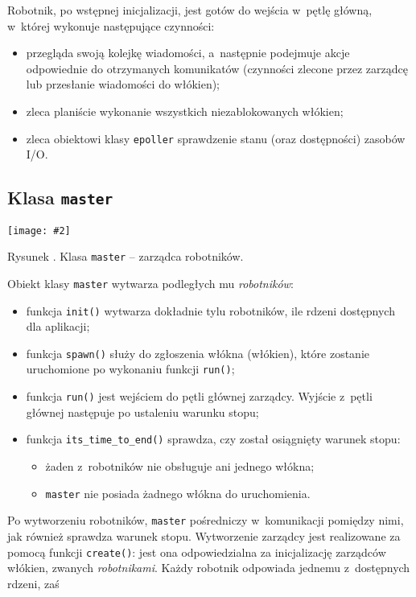 \documentclass[12pt]{mwart}
\newcommand{\code}{\texttt}
\newcounter{figmain}
\newcommand{\myownfigure}[4]{ \newcounter{#1} \setcounter{#1}{\value{figmain}} \addtocounter{figmain}{1} \begin{center} \label{fig:#1} \centering \texttt{[image: \#2]}\\ \nopagebreak[5] \parbox[t]{11.5cm}{Rysunek \arabic{#1}. #3.} \end{center}}
\begin{document}
\par
\indent
  Robotnik, po wstępnej inicjalizacji, jest gotów do wejścia w~pętlę główną, w~której wykonuje następujące czynności:
  \begin{itemize}
    \item przegląda swoją kolejkę wiadomości, a~następnie podejmuje akcje odpowiednie do otrzymanych komunikatów (czynności zlecone przez zarządcę 
      lub przesłanie wiadomości do włókien);
    \item zleca planiście wykonanie wszystkich niezablokowanych włókien;
    \item zleca obiektowi klasy \code{epoller} sprawdzenie stanu (oraz dostępności) zasobów I/O.
  \end{itemize}
\par
%
\newpage
\subsection{Klasa \code{master}}
    \myownfigure{Master}{Master.png}{Klasa \code{master} -- zarządca robotników}{.7}
%
\indent
  Obiekt klasy \code{master} wytwarza podległych mu \emph{robotników}:  
  \begin{itemize}
    \item funkcja \code{init()} wytwarza dokładnie tylu robotników, ile rdzeni dostępnych dla aplikacji;
    \item funkcja \code{spawn()} służy do zgłoszenia włókna (włókien), które zostanie uruchomione po wykonaniu funkcji \code{run()};
    \item funkcja \code{run()} jest wejściem do pętli głównej zarządcy. Wyjście z~pętli głównej następuje po ustaleniu warunku stopu;
    \item funkcja \code{its\_time\_to\_end()} sprawdza, czy został osiągnięty warunek stopu:
      \begin{itemize}
        \item żaden z~robotników nie obsługuje ani jednego włókna;
        \item \code{master} nie posiada żadnego włókna do uruchomienia.
      \end{itemize}
  \end{itemize}
  Po wytworzeniu robotników, \code{master} pośredniczy w~komunikacji pomiędzy nimi, jak również sprawdza warunek stopu.
  Wytworzenie zarządcy jest realizowane za pomocą funkcji \code{create()}: 
  jest ona odpowiedzialna za inicjalizację zarządców włókien, zwanych \emph{robotnikami}.
  Każdy robotnik odpowiada jednemu z~dostępnych rdzeni, zaś
\end{document}

